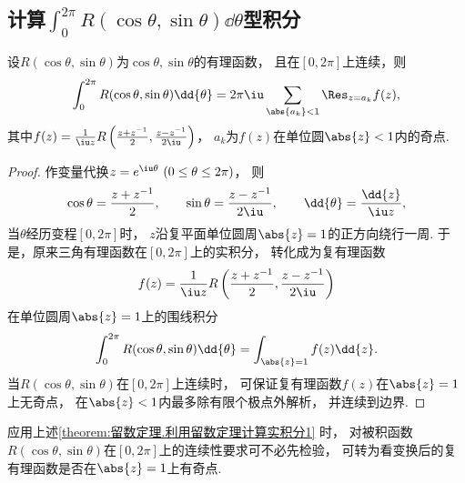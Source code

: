 \subsection{计算\texorpdfstring{\(\int_0^{2\pi} R(\cos\theta,\sin\theta) \dd{\theta}\)型}{在[0,2π]区间上的含有三角函数的}积分}
\begin{theorem}\label{theorem:留数定理.利用留数定理计算实积分1}
设\(R(\cos\theta,\sin\theta)\)为\(\cos\theta,\sin\theta\)的有理函数，
且在\([0,2\pi]\)上连续，则\begin{equation*}
	\int_0^{2\pi} R(\cos\theta,\sin\theta) \dd{\theta}
	= 2\pi\iu \sum_{\abs{a_k}<1} \Res_{z=a_k} f(z),
\end{equation*}
其中\(f(z) = \frac{1}{\iu z} R\left(\frac{z+z^{-1}}{2},\frac{z-z^{-1}}{2\iu}\right)\)，
\(a_k\)为\(f(z)\)在单位圆\(\abs{z}<1\)内的奇点.
\begin{proof}
作变量代换\(z = e^{\iu\theta}\ (0\leq\theta\leq2\pi)\)，
则\begin{equation*}
	\cos\theta = \frac{z+z^{-1}}{2},
	\qquad
	\sin\theta = \frac{z-z^{-1}}{2\iu},
	\qquad
	\dd{\theta} = \frac{\dd{z}}{\iu z},
\end{equation*}
当\(\theta\)经历变程\([0,2\pi]\)时，
\(z\)沿复平面单位圆周\(\abs{z}=1\)的正方向绕行一周.
于是，原来三角有理函数在\([0,2\pi]\)上的实积分，
转化成为复有理函数\begin{equation*}
	f(z) = \frac{1}{\iu z} R\left(\frac{z+z^{-1}}{2},\frac{z-z^{-1}}{2\iu}\right)
\end{equation*}在单位圆周\(\abs{z}=1\)上的围线积分\begin{equation*}
	\int_0^{2\pi} R(\cos\theta,\sin\theta) \dd{\theta}
	= \int_{\abs{z}=1} f(z) \dd{z}.
\end{equation*}
当\(R(\cos\theta,\sin\theta)\)在\([0,2\pi]\)上连续时，
可保证复有理函数\(f(z)\)在\(\abs{z}=1\)上无奇点，
在\(\abs{z}<1\)内最多除有限个极点外解析，
并连续到边界.
\end{proof}
\end{theorem}

应用上述\cref{theorem:留数定理.利用留数定理计算实积分1} 时，
对被积函数\(R(\cos\theta,\sin\theta)\)在\([0,2\pi]\)上的连续性要求可不必先检验，
可转为看变换后的复有理函数是否在\(\abs{z}=1\)上有奇点.

